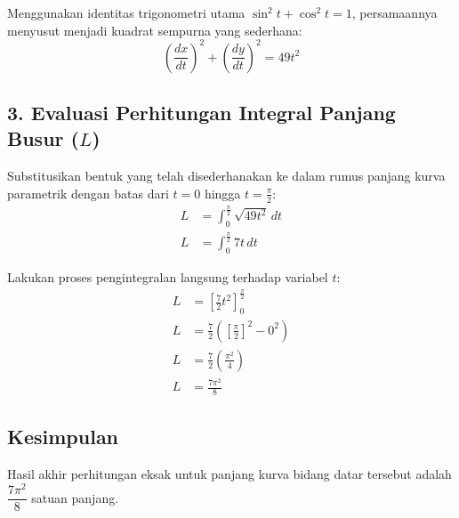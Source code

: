 \documentclass[12pt,a4paper]{article}
\begin{document}
Menggunakan identitas trigonometri utama $\sin^2 t + \cos^2 t = 1$, persamaannya menyusut menjadi kuadrat sempurna yang sederhana:
\begin{equation*}
  \left(\frac{dx}{dt}\right)^2 + \left(\frac{dy}{dt}\right)^2 = 49t^2
\end{equation*}

\subsection*{3. Evaluasi Perhitungan Integral Panjang Busur ($L$)}
Substitusikan bentuk yang telah disederhanakan ke dalam rumus panjang kurva parametrik dengan batas dari $t = 0$ hingga $t = \frac{\pi}{2}$:
\begin{align*}
  L &= \int_{0}^{\frac{\pi}{2}} \sqrt{49t^2} \, dt \\
  L &= \int_{0}^{\frac{\pi}{2}} 7t \, dt
\end{align*}

Lakukan proses pengintegralan langsung terhadap variabel $t$:
\begin{align*}
  L &= \left[ \frac{7}{2}t^2 \right]_{0}^{\frac{\pi}{2}} \\
  L &= \frac{7}{2} \left( \left[ \frac{\pi}{2} \right]^2 - 0^2 \right) \\
  L &= \frac{7}{2} \left( \frac{\pi^2}{4} \right) \\
  L &= \frac{7\pi^2}{8}
\end{align*}

\subsection*{Kesimpulan}
Hasil akhir perhitungan eksak untuk panjang kurva bidang datar tersebut adalah \textbf{$\dfrac{7\pi^2}{8}$} satuan panjang.
\end{document}
